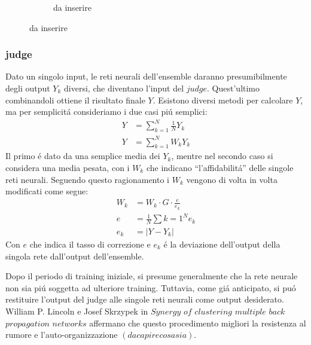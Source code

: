 \documentclass[a4paper,10pt]{article}
\begin{document}
\begin{figure}[h!]
\begin{subfigure}[b]{0.4\linewidth}
   \caption{da inserire}
   \label{EnsembleAdvantagebpng}
  \end{subfigure}
 \end{figure}
 
 \subsubsection{judge}
 
 Dato un singolo input, le reti neurali dell'ensemble daranno presumibilmente degli output $Y_k$ diversi, che diventano l'input del $judge$. Quest'ultimo combinandoli ottiene il risultato finale $Y$. Esistono diversi metodi per calcolare $Y$, ma per semplicit\'a consideriamo i due casi pi\'u semplici:
 \begin{align}
  Y &= \sum_{k=1}^N \frac{1}{N} Y_k \\
  Y &= \sum_{k=1}^N W_k Y_k
 \end{align}
 Il primo \'e dato da una semplice media dei $Y_k$, mentre nel secondo caso si considera una media pesata, con i $W_k$ che indicano ``l'affidabilit\'a'' delle singole reti neurali. Seguendo questo ragionamento i $W_k$ vengono di volta in volta modificati come segue:
 \begin{align}
  W_k &= W_k \cdot G \cdot \frac{e}{e_k} \label{JudgeWeights} \\
  e &= \frac{1}{N} \sum{k=1}^N e_k \\
  e_k &= \left | Y - Y_k \right |
 \end{align}
 Con $e$ che indica il tasso di correzione e $e_k$ \'e la deviazione dell'output della singola rete dall'output dell'ensemble.
 
 Dopo il periodo di training iniziale, si presume generalmente che la rete neurale non sia pi\'u soggetta ad ulteriore training. Tuttavia, come gi\'a  anticipato, si pu\'o restituire l'output del judge alle singole reti neurali come output desiderato. William P. Lincoln e Josef Skrzypek in $Synergy$ $of$ $clustering$ $multiple$ $back$ $propagation$ $networks$ affermano che questo procedimento migliori la resistenza al rumore e l'auto-organizzazione $(da capire cosa sia)$.
  
\end{document}
